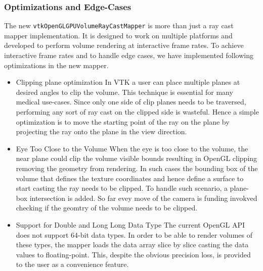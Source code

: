 \subsubsection{Optimizations and Edge-Cases}
The new \texttt{vtkOpenGLGPUVolumeRayCastMapper} is more than just a ray cast mapper implementation. It is designed to work on multiple platforms and developed to perform volume rendering at interactive frame rates. To achieve interactive frame rates and to handle edge cases, we have implemented following optimizations in the new mapper. 

\begin{itemize}
\item Clipping plane optimization 
In VTK a user can place multiple planes at desired angles to clip the volume. This technique is essential for many medical use-cases. Since only one side of clip planes needs to be traversed, performing any sort of ray cast on the clipped side is wasteful. Hence a simple optimization is to move the starting point of the ray on the plane by projecting the ray onto the plane in the view direction. 

\item Eye Too Close to the Volume
When the eye is too close to the volume, the near plane could clip the volume visible bounds resulting in OpenGL clipping removing the geometry from rendering. In such cases the bounding box of the volume that defines the texture coordinates and hence define a surface to start casting the ray needs to be clipped. To handle such scenario, a plane-box intersection is added. So far evey move of the camera is funding invokved checking if the geomtry of the volume needs to be clipped.

\item Support for Double and Long Long Data Type
The current OpenGL API does not support 64-bit data types. In order to be able to render volumes of these types, the mapper loads the data array slice by slice casting the data values to floating-point. This, despite the obvious precision loss, is provided to the user as a convenience feature.

\end{itemize}
